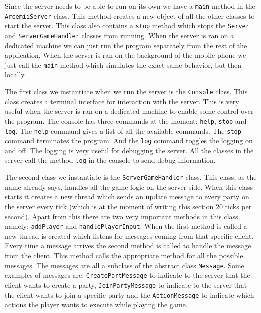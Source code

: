 \documentclass[../main.tex]{subfiles}
\begin{document}
        Since the server needs to be able to run on its own we have a \texttt{main} method in the \texttt{ArcemiiServer} class. This method creates a new object of all the other classes to start the server. This class also contains a \texttt{stop} method which stops the \texttt{Server} and \texttt{ServerGameHandler} classes from running. When the server is ran on a dedicated machine we can just run the program separately from the rest of the application. When the server is ran on the background of the mobile phone we just call the \texttt{main} method which simulates the exact same behavior, but then locally.

        The first class we instantiate when we run the server is the \texttt{Console} class. This class creates a terminal interface for interaction with the server. This is very useful when the server is ran on a dedicated machine to enable some control over the program. The console has three commands at the moment: \texttt{help}, \texttt{stop} and \texttt{log}. The \texttt{help} command gives a list of all the available commands. The \texttt{stop} command terminates the program. And the \texttt{log} command toggles the logging on and off. The logging is very useful for debugging the server. All the classes in the server call the method \texttt{log} in the console to send debug information.

        The second class we instantiate is the \texttt{ServerGameHandler} class. This class, as the name already says, handles all the game logic on the server-side. When this class starts it creates a new thread which sends an update message to every party on the server every tick (which is at the moment of writing this section 20 ticks per second). Apart from this there are two very important methods in this class, namely: \texttt{addPlayer} and \texttt{handlePlayerInput}. When the first method is called a new thread is created which listens for messages coming from that specific client. Every time a message arrives the second method is called to handle the message from the client. This method calls the appropriate method for all the possible messages. The messages are all a subclass of the abstract class \texttt{Message}. Some examples of messages are: \texttt{CreatePartMessage} to indicate to the server that the client wants to create a party, \texttt{JoinPartyMessage} to indicate to the server that the client wants to join a specific party and the \texttt{ActionMessage} to indicate which actions the player wants to execute while playing the game.
\end{document}
